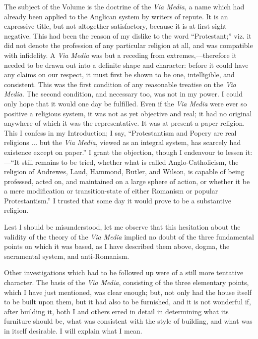 The subject of the Volume is the doctrine of the \emph{Via Media}, a
name which had already been applied to the Anglican system by writers of
repute. It is an expressive title, but not altogether satisfactory,
because it is at first sight negative. This had been the reason of my
dislike to the word ``Protestant;'' viz. it did not denote the profession of any
particular
religion at all, and was compatible with infidelity. A \emph{Via Media}
was but a receding from extremes,—therefore it needed to be drawn out into a
definite shape and character: before
it could have any claims on our respect, it must first be shown to
be one, intelligible, and consistent. This was the first condition of
any reasonable treatise on the \emph{Via Media}. The second condition,
and necessary too, was not in my power. I could only hope that it would
one day be fulfilled. Even if the \emph{Via Media} were ever so positive
a religious system, it was not as yet objective and real; it had no
original anywhere of which it was the representative. It was at present
a paper religion. This I confess in my Introduction; I say,
``Protestantism and Popery are real religions ... but the \emph{Via
Media}, viewed as an integral system, has scarcely had existence
except on paper.'' I grant the objection, though I endeavour to
lessen it:—``It still remains to be tried,
whether what is called Anglo-Catholicism, the religion of Andrewes,
Laud, Hammond, Butler, and Wilson, is capable of being professed, acted
on, and maintained on a large sphere of action, or whether it be a mere
modification or transition-state of either Romanism or popular
Protestantism.'' I trusted that some day it would prove to be a
substantive religion.

Lest I should be misunderstood, let me observe that this hesitation
about the validity of the theory of the \emph{Via Media} implied no
doubt of the three fundamental points on which it was based, as I have
described them above, dogma, the sacramental system, and anti-Romanism.

Other investigations which had to be followed up were of a still more tentative character. The basis of the \emph{Via Media}, consisting of the three
elementary points, which I have just mentioned, was clear enough; but,
not only had the house itself to be built upon them, but it had
also to be furnished, and it is not wonderful if, after building
it, both I and others erred in detail in determining what its furniture should be, what was consistent with the style of building,
and what was in itself desirable. I will explain what I mean.

